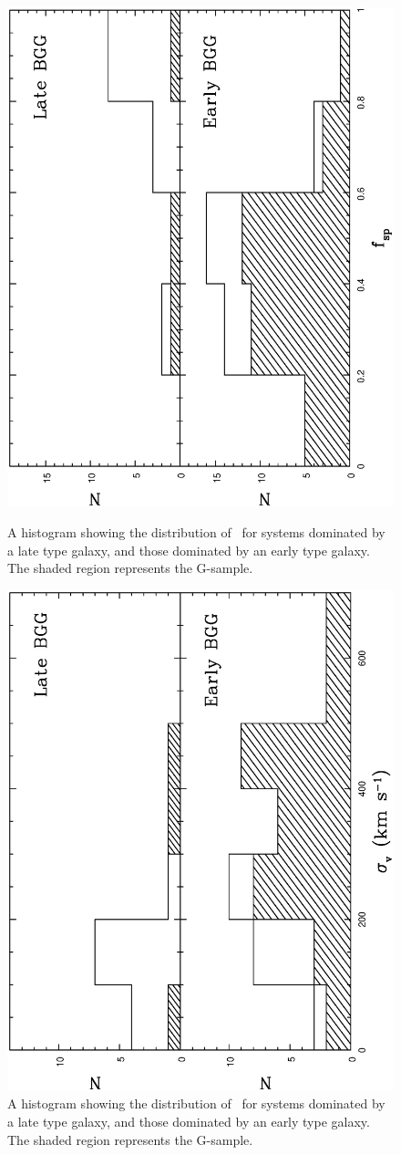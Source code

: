 \documentclass[usenatbib]{mn2e}
\begin{document}
\begin{figure}

  \includegraphics[height=\linewidth,angle=270]{fig_27.ps}
  \caption{A histogram showing the distribution of \fsp\ for systems dominated
           by a late type galaxy, and those dominated by an early type galaxy.
           The shaded region represents the G-sample.}
  \label{fig_fsp_hist}

  \includegraphics[height=\linewidth,angle=270]{fig_28.ps}
  \caption{A histogram showing the distribution of \sigmav\ for systems dominated
           by a late type galaxy, and those dominated by an early type galaxy.
           The shaded region represents the G-sample.}
  \label{fig_sigma_hist}

\end{figure}
\end{document}
